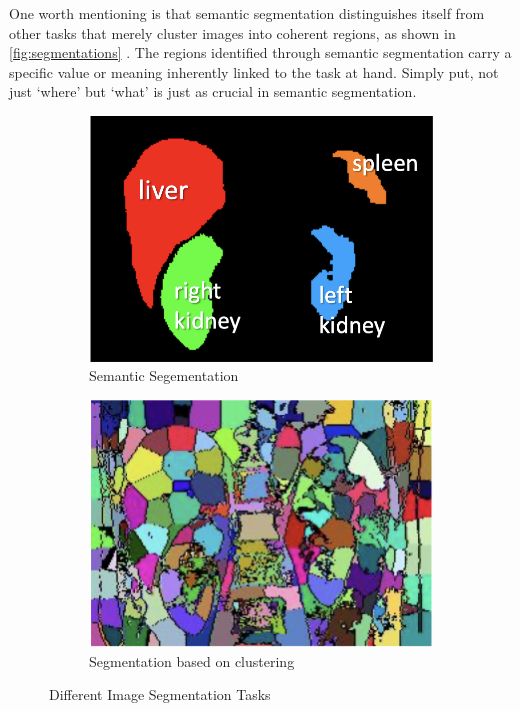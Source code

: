 One worth mentioning is that semantic segmentation distinguishes itself from other tasks that merely cluster images into coherent regions, as shown in \autoref{fig:segmentations} \cite{segmentation-mli}. The regions identified through semantic segmentation carry a specific value or meaning inherently linked to the task at hand. Simply put, not just `where' but `what' is just as crucial in semantic segmentation.
\begin{figure}[htp]
    \centering
    \begin{subfigure}[b]{0.47\textwidth}
        \centering
        \includegraphics[width=\textwidth]{./figures/semantic-segmentation.png}
        \caption{Semantic Segementation}
        \label{fig:semantic-segmentation}
    \end{subfigure}
    \hfill
    \begin{subfigure}[b]{0.47\textwidth}
        \centering
        \includegraphics[width=\textwidth]{./figures/clustering.png}
        \caption{Segmentation based on clustering}
        \label{fig:normal-segmentation}
    \end{subfigure}
       \caption{Different Image Segmentation Tasks}
       \label{fig:segmentations}
\end{figure}
